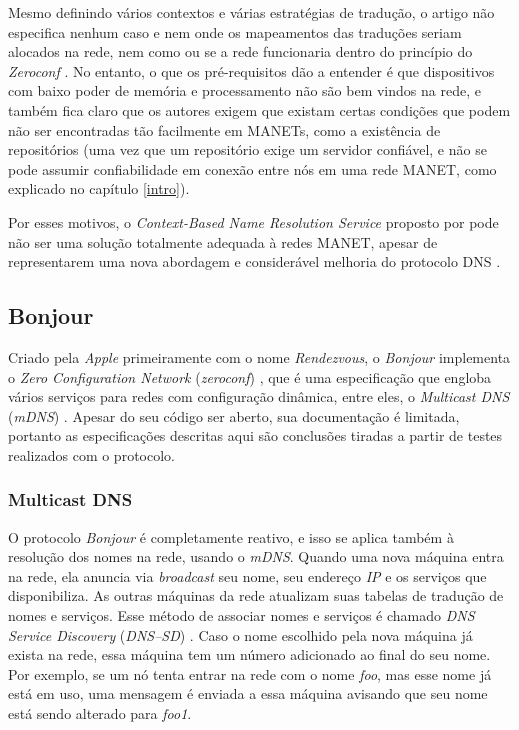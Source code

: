     Mesmo definindo vários contextos e várias estratégias de tradução, o artigo
    não especifica nenhum caso e nem onde os mapeamentos das traduções seriam
    alocados na rede, nem como ou se a rede funcionaria dentro do princípio do
    \textit{Zeroconf} \cite{zeroconf}. No entanto, o que os pré-requisitos dão
    a entender é que dispositivos com baixo poder de memória e processamento
    não são bem vindos na rede, e também fica claro que os autores exigem que
    existam certas condições que podem não ser encontradas tão facilmente em
    MANETs, como a existência de repositórios (uma vez que um repositório exige
    um servidor confiável, e não se pode assumir confiabilidade em conexão entre
    nós em uma rede MANET, como explicado no capítulo \ref{intro}).
    
    Por esses motivos, o \textit{Context-Based Name Resolution Service} proposto
    por \cite{context-dns} pode não ser uma solução totalmente adequada à
    redes MANET, apesar de representarem uma nova abordagem e considerável melhoria
    do protocolo DNS \cite{rfc1035}.

\subsection{Bonjour}
\label{Bonjour}

    Criado pela \textit{Apple} primeiramente com o nome \textit{Rendezvous}, o 
    \textit{Bonjour} implementa o \textit{Zero Configuration Network} 
    (\textit{zeroconf}) \cite{zeroconf}, que é uma especificação que engloba vários
    serviços para redes com configuração dinâmica, entre eles, o 
    \textit{Multicast DNS} (\textit{mDNS}) \cite{mdns}. Apesar do seu código ser 
    aberto, sua documentação é limitada, portanto as especificações descritas aqui
    são conclusões tiradas a partir de testes realizados com o protocolo.
  
    \subsubsection{Multicast DNS}
    \label{MDNS}
  
        O protocolo \textit{Bonjour} é completamente reativo, e isso se aplica também
        à resolução dos nomes na rede, usando o \textit{mDNS}. Quando uma nova máquina
        entra na rede, ela anuncia via \textit{broadcast} seu nome, seu endereço 
        \emph{IP} e os serviços que disponibiliza. As outras máquinas da rede 
        atualizam suas tabelas de tradução de nomes e serviços. Esse método de 
        associar nomes e serviços é chamado \textit{DNS Service Discovery} 
        (\textit{DNS--SD}) \cite{dnssd}. Caso o nome escolhido pela nova máquina 
        já exista na rede, essa máquina tem um número adicionado ao final do seu 
        nome. Por exemplo, se um nó tenta entrar na rede com o nome \emph{foo}, mas
        esse nome já está em uso, uma mensagem é enviada a essa máquina avisando 
        que seu nome está sendo alterado para \emph{foo1}.

